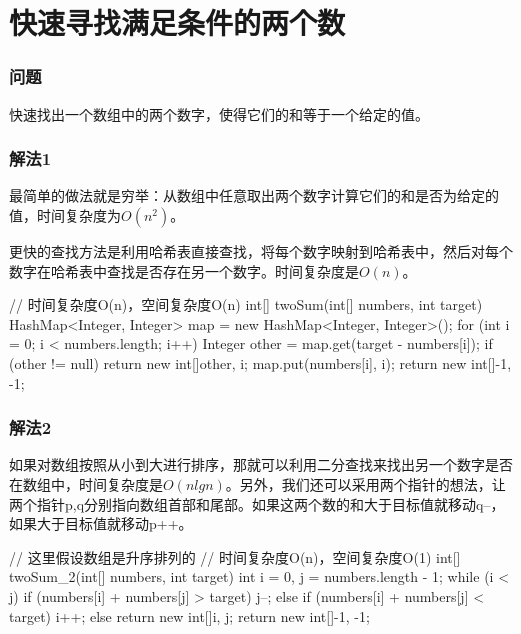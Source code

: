 \section{快速寻找满足条件的两个数} %
\label{sec:two-sum}

\subsubsection{问题}
快速找出一个数组中的两个数字，使得它们的和等于一个给定的值。

\subsubsection{解法1}
最简单的做法就是穷举：从数组中任意取出两个数字计算它们的和是否为给定的值，时间复杂度为$O(n^2)$。

更快的查找方法是利用哈希表直接查找，将每个数字映射到哈希表中，然后对每个数字在哈希表中查找是否存在另一个数字。时间复杂度是$O(n)$。

\begin{Code}
// 时间复杂度O(n)，空间复杂度O(n)
int[] twoSum(int[] numbers, int target) {
    HashMap<Integer, Integer> map = new HashMap<Integer, Integer>();
    for (int i = 0; i < numbers.length; i++) {
        Integer other = map.get(target - numbers[i]);
        if (other != null) {
            return new int[]{other, i};
        }
        map.put(numbers[i], i);
    }
    return new int[]{-1, -1};
}
\end{Code}

\subsubsection{解法2}
如果对数组按照从小到大进行排序，那就可以利用二分查找来找出另一个数字是否在数组中，时间复杂度是$O(nlgn)$。另外，我们还可以采用两个指针的想法，让两个指针p,q分别指向数组首部和尾部。如果这两个数的和大于目标值就移动q--，
如果大于目标值就移动p++。

\begin{Code}
// 这里假设数组是升序排列的
// 时间复杂度O(n)，空间复杂度O(1)
int[] twoSum_2(int[] numbers, int target) {
    int i = 0, j = numbers.length - 1;
    while (i < j) {
        if (numbers[i] + numbers[j] > target) {
            j--;
        } else if (numbers[i] + numbers[j] < target) {
            i++;
        } else {
            return new int[]{i, j};
        }
    }
    return new int[]{-1, -1};
}
\end{Code}